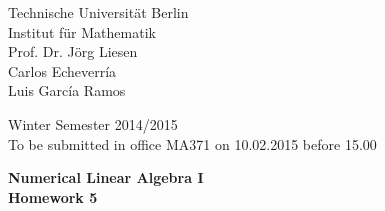 \documentclass[10pt]{report}
\begin{document}
\begin{minipage}[t]{0.58\textwidth}
Technische Universit\"at Berlin\\
Institut f\"ur Mathematik\\
Prof. Dr. J\"org Liesen\\
Carlos Echeverr\'ia\\
Luis Garc\'ia Ramos
\end{minipage}
\hfill
\begin{minipage}[t]{0.48\textwidth}
\begin{flushright}
Winter Semester 2014/2015\\
To be submitted in office MA371 on 10.02.2015 before 15.00
\end{flushright}
\end{minipage}
\begin{center}
\textbf{{Numerical Linear Algebra I}}\\
\textbf{Homework 5}
\end{center}
\thispagestyle{empty}
\vspace{0cm}
\end{document}
